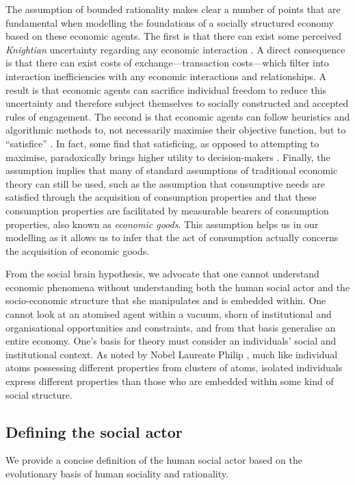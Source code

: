 The assumption of bounded rationality makes clear a number of points that are fundamental when modelling the foundations of a socially structured economy based on these economic agents. The first is that there can exist some perceived \emph{Knightian} uncertainty regarding any economic interaction \citep{Knight1921}. A direct consequence is that there can exist costs of exchange---transaction costs---which filter into interaction inefficiencies with any economic interactions and relationships. A result is that economic agents can sacrifice individual freedom to reduce this uncertainty and therefore subject themselves to socially constructed and accepted rules of engagement. The second is that economic agents can follow heuristics and algorithmic methods to, not necessarily maximise their objective function, but to ``satisfice'' \citep{Simon1947, Simon1956}. In fact, some find that satisficing, as opposed to attempting to maximise, paradoxically brings higher utility to decision-makers \citep{Schwartz2002}. Finally, the assumption implies that many of standard assumptions of traditional economic theory can still be used, such as the assumption that consumptive needs are satisfied through the acquisition of consumption properties and that these consumption properties are facilitated by measurable bearers of consumption properties, also known as \emph{economic goods}. This assumption helps us in our modelling as it allows us to infer that the act of consumption actually concerns the acquisition of economic goods.

From the social brain hypothesis, we advocate that one cannot understand economic phenomena without understanding both the human social actor and the socio-economic structure that she manipulates and is embedded within. One cannot look at an atomised agent within a vacuum, shorn of institutional and organisational opportunities and constraints, and from that basis generalise an entire economy. One's basis for theory must consider an individuals' social and institutional context. As noted by Nobel Laureate Philip \citet{Anderson1972}, much like individual atoms possessing different properties from clusters of atoms, isolated individuals express different properties than those who are embedded within some kind of social structure.

\subsection{Defining the social actor}

We provide a concise definition of the human social actor based on the evolutionary basis of human sociality and rationality.

